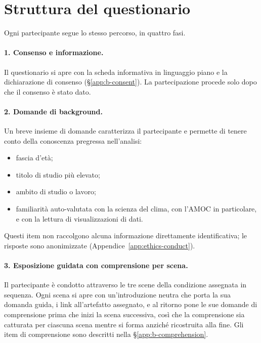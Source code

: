 \section{Struttura del questionario}
\label{app:b-structure}

Ogni partecipante segue lo stesso percorso, in quattro fasi.

\paragraph{1. Consenso e informazione.}
Il questionario si apre con la scheda informativa in linguaggio piano e la dichiarazione di consenso (\S\ref{app:b-consent}). La partecipazione procede solo dopo che il consenso è stato dato.

\paragraph{2. Domande di background.}
Un breve insieme di domande caratterizza il partecipante e permette di tenere conto della conoscenza pregressa nell'analisi:
\begin{itemize}
    \item fascia d'età;
    \item titolo di studio più elevato;
    \item ambito di studio o lavoro;
    \item familiarità auto-valutata con la scienza del clima, con l'AMOC in particolare, e con la lettura di visualizzazioni di dati.
\end{itemize}
Questi item non raccolgono alcuna informazione direttamente identificativa; le risposte sono anonimizzate (Appendice~\ref{app:ethics-conduct}).

\paragraph{3. Esposizione guidata con comprensione per scena.}
Il partecipante è condotto attraverso le tre scene della condizione assegnata in sequenza. Ogni scena si apre con un'introduzione neutra che porta la sua domanda guida, i link all'artefatto assegnato, e al ritorno pone le sue domande di comprensione prima che inizi la scena successiva, così che la comprensione sia catturata per ciascuna scena mentre si forma anziché ricostruita alla fine. Gli item di comprensione sono descritti nella \S\ref{app:b-comprehension}.

